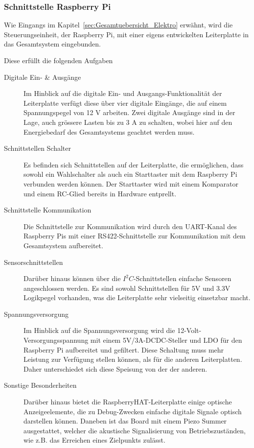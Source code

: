 \documentclass[main.tex]{subfiles} %
\begin{document}

\subsubsection{Schnittstelle Raspberry Pi}
Wie Eingangs im Kapitel~\ref{sec:Gesamtuebersicht_Elektro} erwähnt, wird die
Steuerungseinheit, der Raspberry Pi, mit einer eigens entwickelten Leiterplatte
in das Gesamtsystem eingebunden.

Diese erfüllt die folgenden Aufgaben

\begin{description}
      \item[Digitale Ein- \& Ausgänge] Im Hinblick auf die digitale Ein- und
            Ausgangs-Funktionalität der Leiterplatte verfügt diese über vier digitale
            Eingänge, die auf einem Spannungspegel von 12 V arbeiten. Zwei digitale
            Ausgänge sind in der Lage, auch grössere Lasten bis zu 3 A zu schalten, wobei
            hier auf den Energiebedarf des Gesamtsystems geachtet werden muss.
      \item[Schnittstellen Schalter] Es befinden sich Schnittstellen auf der Leiterplatte,
            die ermöglichen, dass sowohl ein Wahlschalter als auch ein Starttaster mit dem
            Raspberry Pi verbunden werden können. Der Starttaster wird mit einem Komparator
            und einem RC-Glied bereits in Hardware entprellt.
      \item[Schnittstelle Kommunikation] Die Schnittstelle zur Kommunikation wird durch den
            UART-Kanal des Raspberry Pis mit einer RS422-Schnittstelle zur Kommunikation
            mit dem Gesamtsystem aufbereitet.
      \item[Sensorschnittstellen] Darüber hinaus können über die $I^2C$-Schnittstellen
            einfache Sensoren angeschlossen werden. Es sind sowohl Schnittstellen für 5V
            und 3.3V Logikpegel vorhanden, was die Leiterplatte sehr vielseitig einsetzbar
            macht.
      \item[Spannungsversorgung] Im Hinblick auf die Spannungsversorgung wird die
            12-Volt-Versorgungsspannung mit einem 5V/3A-DCDC-Steller und LDO für den
            Raspberry Pi aufbereitet und gefiltert. Diese Schaltung muss mehr Leistung zur
            Verfügung stellen können, als für die anderen Leiterplatten. Daher
            unterschiedet sich diese Speisung von der der anderen.
      \item[Sonstige Besonderheiten] Darüber hinaus bietet die RaspberryHAT-Leiterplatte
            einige optische Anzeigeelemente, die zu Debug-Zwecken einfache digitale Signale
            optisch darstellen können. Daneben ist das Board mit einem Piezo Summer
            ausgestattet, welcher die akustische Signalisierung von Betriebszuständen, wie
            z.B. das Erreichen eines Zielpunkts zulässt.
\end{description}
\end{document}
